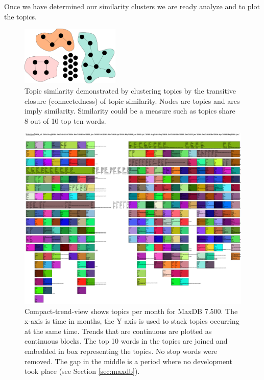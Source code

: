 \documentclass[times, 10pt,twocolumn]{article}
\begin{document}
Once we have determined our similarity clusters we are ready analyze
and to plot the topics.

\begin{figure}[t]
  \centering
  \includegraphics[width=0.42\textwidth]{transitiveclosure}
  \caption{Topic similarity demonstrated by clustering topics by the transitive closure (connectedness)
    of topic similarity. Nodes are topics and
    arcs imply similarity. Similarity could be a measure such as
    topics share 8 out of 10 top ten words.}
\label{fig:closure}
\end{figure}


\begin{figure}
  \centering
  \includegraphics[width=1.0\textwidth]{time-smear-plot}%
  \caption{Compact-trend-view shows topics per month for MaxDB
    7.500. The x-axis is time in months, the Y axis is used to stack
    topics occurring at the same time. Trends that are continuous are
    plotted as continuous blocks. The top 10 words in the topics are
    joined and embedded in box representing the topics. No stop words were removed. The gap in the
    middle is a period where no development took place (see Section \ref{sec:maxdb}).}
  \label{fig:topicsmear}
\end{figure}
\end{document}
